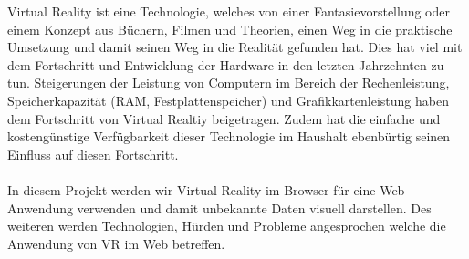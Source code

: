 
Virtual Reality ist eine Technologie, welches von einer Fantasievorstellung oder einem Konzept aus Büchern, Filmen und Theorien, einen Weg in
die praktische Umsetzung und damit seinen Weg in die Realität gefunden hat. Dies hat viel mit dem Fortschritt und Entwicklung der Hardware in
den letzten Jahrzehnten zu tun. Steigerungen der Leistung von Computern im Bereich der Rechenleistung, Speicherkapazität (RAM,
Festplattenspeicher) und Grafikkartenleistung haben dem Fortschritt von Virtual Realtiy beigetragen. Zudem hat die einfache und
kostengünstige Verfügbarkeit dieser Technologie im Haushalt ebenbürtig seinen Einfluss auf diesen Fortschritt. \\ \\
In diesem Projekt werden wir Virtual Reality im Browser für eine Web-Anwendung verwenden und damit unbekannte Daten visuell darstellen. Des
weiteren werden Technologien, Hürden und Probleme angesprochen welche die Anwendung von VR im Web betreffen.\\

